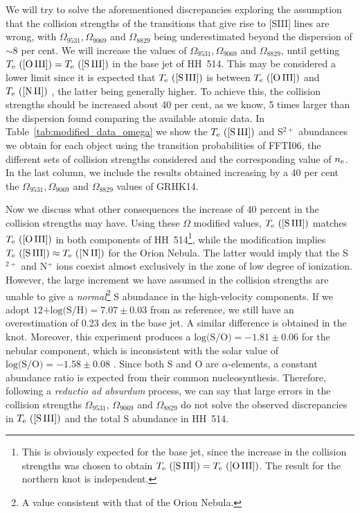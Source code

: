 \documentclass[fleqn,usenatbib]{mnras}
\begin{document}
We will try to solve the aforementioned discrepancies exploring the assumption that the collision strengths of the transitions that give rise to [S\thinspace III] lines are wrong, with $\Omega_{9531}, \Omega_{9069}$ and $\Omega_{8829}$ being underestimated beyond the dispersion of $\sim8$ per cent. We will increase the values of $\Omega_{9531}, \Omega_{9069}$ and $\Omega_{8829}$, until getting $T_{\rm e} \text{ ([O\thinspace III])}=T_{\rm e} \text{ ([S\thinspace III])} $ in the base jet of HH~514. This may be considered a lower limit since it is expected that $T_{\rm e} \text{ ([S\thinspace III])} $ is between $T_{\rm e} \text{ ([O\thinspace III])} $ and $T_{\rm e} \text{ ([N\thinspace II])} $ \citep[][]{Berg20}, the latter being generally higher. To achieve this, the collision strengths should be increased about 40 per cent, as we know, 5 times larger than the dispersion found comparing the available atomic data. In Table~\ref{tab:modified_data_omega} we show the $T_{\rm e} \text{ ([S\thinspace III])} $ and  S$^{2+}$ abundances we obtain for each object using the transition probabilities of FFTI06, the different sets of collision strengths considered and the corresponding value of $n_{\rm e}$. In the last column, we include the results obtained increasing by a 40 per cent the $\Omega_{9531}, \Omega_{9069}$ and $\Omega_{8829}$ values of GRHK14. 

Now we discuss what other consequences the increase of 40 percent in the collision strengths may have. Using these $\Omega$ modified values, $T_{\rm e} \text{ ([S\thinspace III])}$ matches $T_{\rm e} \text{ ([O\thinspace III])}$ in both components of HH~514\footnote{This is obviously expected for the base jet, since the increase in the collision strengths was chosen to obtain $T_{\rm e} \text{ ([S\thinspace III])}= T_{\rm e} \text{ ([O\thinspace III])}$. The result for the northern knot is independent.}, while the modification implies $T_{\rm e} \text{ ([S\thinspace III])}\approx T_{\rm e} \text{ ([N\thinspace II])}$ for the Orion Nebula. The latter would imply that the S$^{2+}$ and N$^{+}$ ions coexist almost exclusively in the zone of low degree of ionization. However, the large increment we have assumed in the collision strengths are unable to give a \textit{normal}\footnote{A value consistent with that of the Orion Nebula.} S abundance in the high-velocity components. If we adopt $\text{12+log(S/H)}=7.07 \pm 0.03$ from \citet{mendez2021-2} as reference, we still have an overestimation of 0.23 dex in the base jet. A similar difference is obtained in the knot. Moreover, this experiment produces a $\text{log(S/O)} = -1.81 \pm 0.06$ for the nebular component, which is inconsistent with the solar value of $\text{log(S/O)}=-1.58 \pm 0.08$ \citep{lodders19}. Since both S and O are $\alpha$-elements, a constant abundance ratio is expected from their common nucleosynthesis. Therefore, following a \textit{reductio ad absurdum} process, we can say that large errors in the collision strengths $\Omega_{9531}$, $\Omega_{9069}$ and $\Omega_{8829}$ do not solve the observed discrepancies in  $T_{\rm e} \text{ ([S\thinspace III])}$ and the total S abundance in HH~514.
\end{document}

